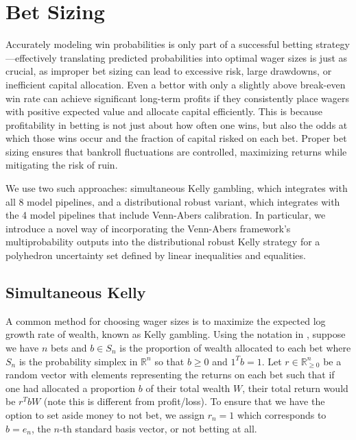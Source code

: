 \documentclass[12pt,twoside]{report}
\begin{document}
\section{Bet Sizing}

Accurately modeling win probabilities is only part of a successful betting strategy---effectively translating predicted probabilities into optimal wager sizes is just as crucial, as improper bet sizing can lead to excessive risk, large drawdowns, or inefficient capital allocation. Even a bettor with only a slightly above break-even win rate can achieve significant long-term profits if they consistently place wagers with positive expected value and allocate capital efficiently. This is because profitability in betting is not just about how often one wins, but also the odds at which those wins occur and the fraction of capital risked on each bet. Proper bet sizing ensures that bankroll fluctuations are controlled, maximizing returns while mitigating the risk of ruin.

We use two such approaches: simultaneous Kelly gambling, which integrates with all 8 model pipelines, and a distributional robust variant, which integrates with the 4 model pipelines that include Venn-Abers calibration. In particular, we introduce a novel way of incorporating the Venn-Abers framework's multiprobability outputs into the distributional robust Kelly strategy for a polyhedron uncertainty set defined by linear inequalities and equalities.

\subsection{Simultaneous Kelly}

A common method for choosing wager sizes is to maximize the expected log growth rate of wealth, known as Kelly gambling. Using the notation in \citep{sun_2021}, suppose we have $n$ bets and $b \in S_n$ is the proportion of wealth allocated to each bet where $S_n$ is the probability simplex in $\mathbb{R}^n$ so that $b \geq 0$ and $1^T b = 1$. Let $r \in \mathbb{R}_{\geq 0}^{n}$ be a random vector with elements representing the returns on each bet such that if one had allocated a proportion $b$ of their total wealth $W$, their total return would be $r^T bW$ (note this is different from profit/loss). To ensure that we have the option to set aside money to not bet, we assign $r_n = 1$ which corresponds to $b = e_n$, the $n$-th standard basis vector, or not betting at all.
\end{document}
